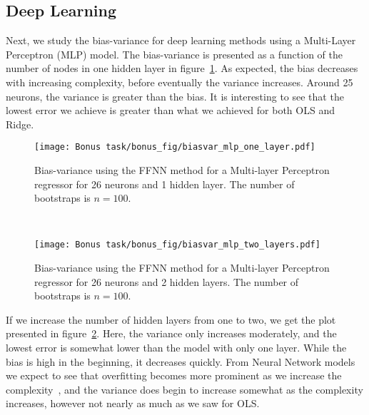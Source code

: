 \documentclass[reprint,english,notitlepage]{revtex4-1}  %
\begin{document}
\subsection*{Deep Learning} %
Next, we study the bias-variance for deep learning methods using a Multi-Layer Perceptron (MLP) model. The bias-variance is presented as a function of the number of nodes in one hidden layer in figure~\ref{fig: MLP}. 
As expected, the bias decreases with increasing complexity, before eventually the variance increases. Around 25 neurons, the variance is greater than the bias. It is interesting to see that the lowest error we achieve is greater than what we achieved for both OLS and Ridge. 
\begin{figure}[h!]
    \centering %
    \texttt{[image: Bonus task/bonus\_fig/biasvar\_mlp\_one\_layer.pdf]} 
    \caption{Bias-variance using the FFNN method for a Multi-layer Perceptron regressor for 26 neurons and 1 hidden layer. The number of bootstraps is $n=100$.}
    \label{fig: MLP}
\end{figure}
\vspace{3mm}
\\ 
\begin{figure}[h!]
    \centering %
    \texttt{[image: Bonus task/bonus\_fig/biasvar\_mlp\_two\_layers.pdf]} 
    \caption{Bias-variance using the FFNN method for a Multi-layer Perceptron regressor for 26 neurons and 2 hidden layers. The number of bootstraps is $n=100$.}
    \label{fig: MLP_two}
\end{figure}
If we increase the number of hidden layers from one to two, we get the plot presented in figure~\ref{fig: MLP_two}. Here, the variance only increases moderately, and the lowest error is somewhat lower than the model with only one layer. While the bias is high in the beginning, it decreases quickly. 
From Neural Network models we expect to see that overfitting becomes more prominent as we increase the complexity~\cite{friedman}, and the variance does begin to increase somewhat as the complexity increases, however not nearly as much as we saw for OLS. 
\end{document}
